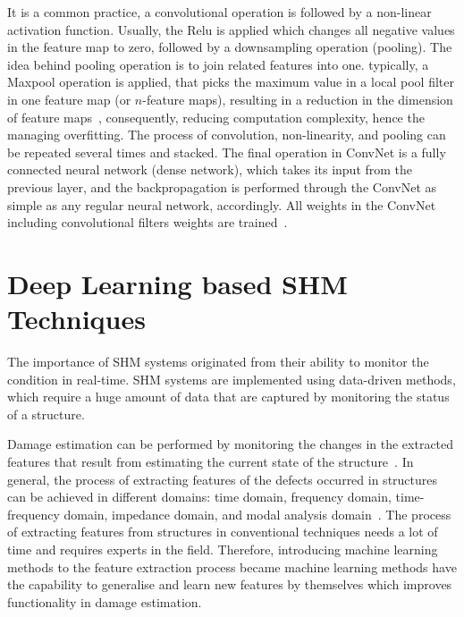 It is a common practice, a convolutional operation is followed by a non-linear activation function.
Usually, the Relu is applied which changes all negative values in the feature map to zero, followed by a downsampling operation (pooling). 
The idea behind pooling operation is to join related features into one. typically, a Maxpool operation is applied, that picks the maximum value in a local pool filter in one feature map (or \(n\)-feature maps), resulting in a reduction in the dimension of feature maps~\cite{Lecun2015}, consequently, reducing computation complexity, hence the managing overfitting.
The process of convolution, non-linearity, and pooling can be repeated several times and stacked. 
The final operation in ConvNet is a fully connected neural network (dense network), which takes its input from the previous layer, and the backpropagation is performed through the ConvNet as simple as any regular neural network, accordingly.
All weights in the ConvNet including convolutional filters weights are trained~\cite{Lecun2015}.

 
\section{Deep Learning based SHM Techniques}

The importance of SHM systems originated from their ability to monitor the  condition  in  real-time.
SHM systems are implemented using data-driven methods, which require a huge amount of data that are captured by monitoring the status of a structure.

Damage estimation can be performed by monitoring the changes in the extracted features that result from estimating the current state of the structure~\cite{Lin2017a}.
In general, the process of extracting features of the defects occurred in structures can be achieved in different domains: time domain, frequency domain, time-frequency domain, impedance domain, and modal analysis domain~\cite{Khan2019}.
The process of extracting features from structures in conventional techniques needs a lot of time and requires experts in the field. 
Therefore, introducing machine learning methods to the feature extraction process became   machine learning methods have the capability to generalise and learn new features by themselves which improves   functionality in damage estimation.




